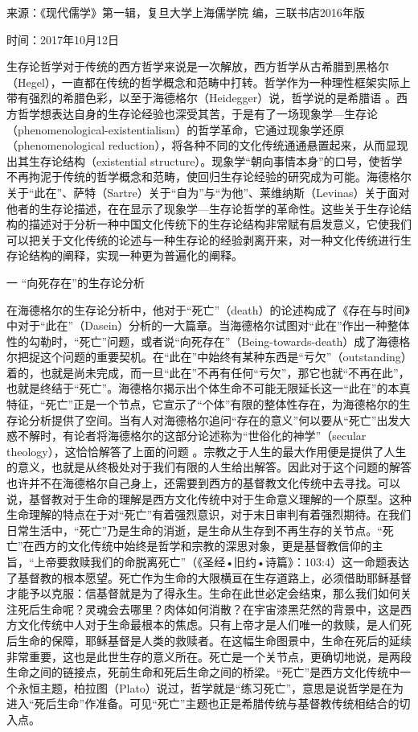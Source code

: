 \documentclass[UTF8, 12pt, a4paper]{ctexrep}
\begin{document}
来源：《现代儒学》第一辑，复旦大学上海儒学院 编，三联书店2016年版

时间：2017年10月12日

生存论哲学对于传统的西方哲学来说是一次解放，西方哲学从古希腊到黑格尔（Hegel），一直都在传统的哲学概念和范畴中打转。哲学作为一种理性框架实际上带有强烈的希腊色彩，以至于海德格尔（Heidegger）说，哲学说的是希腊语 。西方哲学想表达自身的生存论经验也深受其苦，于是有了一场现象学—生存论（phenomenological-existentialism）的哲学革命，它通过现象学还原（phenomenological reduction），将各种不同的文化传统通通悬置起来，从而显现出其生存论结构（existential structure）。现象学“朝向事情本身”的口号，使哲学不再拘泥于传统的哲学概念和范畴，使回归生存论经验的研究成为可能。海德格尔关于“此在”、萨特（Sartre）关于“自为”与“为他”、莱维纳斯（Levinas）关于面对他者的生存论描述，在在显示了现象学—生存论哲学的革命性。这些关于生存论结构的描述对于分析一种中国文化传统下的生存论结构非常赋有启发意义，它使我们可以把关于文化传统的论述与一种生存论的经验剥离开来，对一种文化传统进行生存论结构的阐释，实现一种更为普遍化的阐释。

一 “向死存在”的生存论分析

在海德格尔的生存论分析中，他对于“死亡”（death）的论述构成了《存在与时间》中对于“此在”（Dasein）分析的一大篇章。当海德格尔试图对“此在”作出一种整体性的勾勒时，“死亡”问题，或者说“向死存在”（Being-towards-death）成了海德格尔把捉这个问题的重要契机。在“此在”中始终有某种东西是“亏欠”（outstanding）着的，也就是尚未完成，而一旦“此在”不再有任何“亏欠”，那它也就“不再在此”，也就是终结于“死亡”。海德格尔揭示出个体生命不可能无限延长这一“此在”的本真特征，“死亡”正是一个节点，它宣示了“个体”有限的整体性存在，为海德格尔的生存论分析提供了空间。当有人对海德格尔追问“存在的意义”何以要从“死亡”出发大惑不解时，有论者将海德格尔的这部分论述称为“世俗化的神学”（secular theology），这恰恰解答了上面的问题 。宗教之于人生的最大作用便是提供了人生的意义，也就是从终极处对于我们有限的人生给出解答。因此对于这个问题的解答也许并不在海德格尔自己身上，还需要到西方的基督教文化传统中去寻找。可以说，基督教对于生命的理解是西方文化传统中对于生命意义理解的一个原型。这种生命理解的特点在于对“死亡”有着强烈意识，对于末日审判有着强烈期待。在我们日常生活中，“死亡”乃是生命的消逝，是生命从生存到不再生存的关节点。“死亡”在西方的文化传统中始终是哲学和宗教的深思对象，更是基督教信仰的主旨，“上帝要救赎我们的命脱离死亡”（《圣经•旧约•诗篇》：103:4）这一命题表达了基督教的根本愿望。死亡作为生命的大限横亘在生存道路上，必须借助耶稣基督才能予以克服：信基督就是为了得永生。生命在此世必定会结束，那么我们如何关注死后生命呢？灵魂会去哪里？肉体如何消散？在宇宙漆黑茫然的背景中，这是西方文化传统中人对于生命最根本的焦虑。只有上帝才是人们唯一的救赎，是人们死后生命的保障，耶稣基督是人类的救赎者。在这幅生命图景中，生命在死后的延续非常重要，这也是此世生存的意义所在。死亡是一个关节点，更确切地说，是两段生命之间的链接点，死前生命和死后生命之间的桥梁。“死亡”是西方文化传统中一个永恒主题，柏拉图（Plato）说过，哲学就是“练习死亡”，意思是说哲学是在为进入“死后生命”作准备。可见“死亡”主题也正是希腊传统与基督教传统相结合的切入点。
\end{document}
